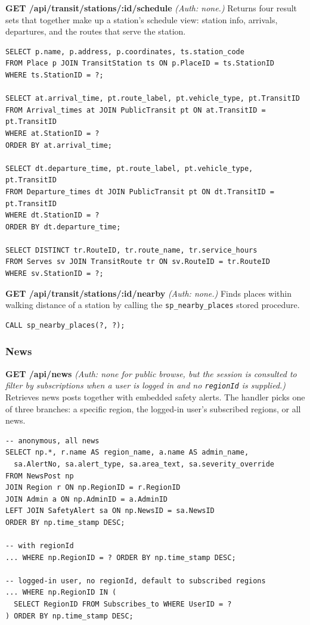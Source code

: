 \textbf{GET /api/transit/stations/:id/schedule} \textit{(Auth: none.)}
Returns four result sets that together make up a station's schedule view: station info, arrivals, departures, and the routes that serve the station.
\begin{lstlisting}[language=MySQL]
SELECT p.name, p.address, p.coordinates, ts.station_code
FROM Place p JOIN TransitStation ts ON p.PlaceID = ts.StationID
WHERE ts.StationID = ?;

SELECT at.arrival_time, pt.route_label, pt.vehicle_type, pt.TransitID
FROM Arrival_times at JOIN PublicTransit pt ON at.TransitID = pt.TransitID
WHERE at.StationID = ?
ORDER BY at.arrival_time;

SELECT dt.departure_time, pt.route_label, pt.vehicle_type, pt.TransitID
FROM Departure_times dt JOIN PublicTransit pt ON dt.TransitID = pt.TransitID
WHERE dt.StationID = ?
ORDER BY dt.departure_time;

SELECT DISTINCT tr.RouteID, tr.route_name, tr.service_hours
FROM Serves sv JOIN TransitRoute tr ON sv.RouteID = tr.RouteID
WHERE sv.StationID = ?;
\end{lstlisting}

\textbf{GET /api/transit/stations/:id/nearby} \textit{(Auth: none.)}
Finds places within walking distance of a station by calling the \texttt{sp\_nearby\_places} stored procedure.
\begin{lstlisting}[language=MySQL]
CALL sp_nearby_places(?, ?);
\end{lstlisting}

\subsubsection{News}

\textbf{GET /api/news} \textit{(Auth: none for public browse, but the session is consulted to filter by subscriptions when a user is logged in and no \texttt{regionId} is supplied.)}
Retrieves news posts together with embedded safety alerts. The handler picks one of three branches: a specific region, the logged-in user's subscribed regions, or all news.
\begin{lstlisting}[language=MySQL]
-- anonymous, all news
SELECT np.*, r.name AS region_name, a.name AS admin_name,
  sa.AlertNo, sa.alert_type, sa.area_text, sa.severity_override
FROM NewsPost np
JOIN Region r ON np.RegionID = r.RegionID
JOIN Admin a ON np.AdminID = a.AdminID
LEFT JOIN SafetyAlert sa ON np.NewsID = sa.NewsID
ORDER BY np.time_stamp DESC;

-- with regionId
... WHERE np.RegionID = ? ORDER BY np.time_stamp DESC;

-- logged-in user, no regionId, default to subscribed regions
... WHERE np.RegionID IN (
  SELECT RegionID FROM Subscribes_to WHERE UserID = ?
) ORDER BY np.time_stamp DESC;
\end{lstlisting}

